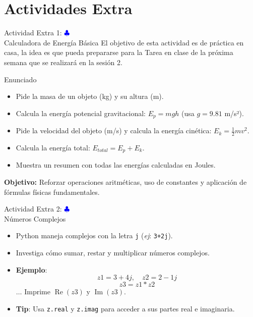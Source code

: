 \documentclass[10pt]{beamer}
\begin{document}
\section{Actividades Extra}



\begin{frame}{Actividad Extra 1: \hfill \textcolor{blue}{$\clubsuit$} \\ Calculadora de Energía Básica}
  El objetivo de esta actividad es de práctica en casa, la idea es que pueda prepararse para la Tarea en clase de la próxima semana que se realizará en la sesión 2.
  \begin{block}{Enunciado}
    \begin{itemize}
      \item Pide la masa de un objeto (kg) y su altura (m).
      \item Calcula la energía potencial gravitacional: \(E_p = mgh\) (usa \(g = 9.81\) m/s²).
      \item Pide la velocidad del objeto (m/s) y calcula la energía cinética: \(E_k = \frac{1}{2}mv^2\).
      \item Calcula la energía total: \(E_{total} = E_p + E_k\).
      \item Muestra un resumen con todas las energías calculadas en Joules.
    \end{itemize}
  \end{block}
  \textbf{Objetivo:} Reforzar operaciones aritméticas, uso de constantes y aplicación de fórmulas físicas fundamentales.
\end{frame}


\begin{frame}{Actividad Extra 2: \hfill \textcolor{blue}{$\clubsuit$} \\ Números Complejos}
  \begin{itemize}
    \item Python maneja complejos con la letra \texttt{j} (\emph{ej}: \texttt{3+2j}).
    \item Investiga cómo sumar, restar y multiplicar números complejos.
    \item \textbf{Ejemplo}:
      \[
        z1 = 3 + 4j, \quad z2 = 2 - 1j
      \]
      \[
        z3 = z1 * z2
      \]
      \(\dots\) Imprime \(\operatorname{Re}(z3)\) y \(\operatorname{Im}(z3)\).
    \item \textbf{Tip}: Usa \texttt{z.real} y \texttt{z.imag} para acceder a sus partes real e imaginaria.
  \end{itemize}
\end{frame}
\end{document}

